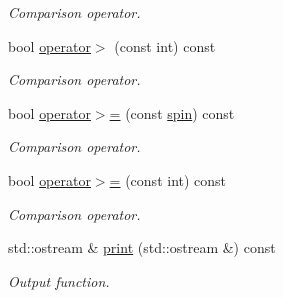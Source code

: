 \begin{DoxyCompactItemize}
\begin{DoxyCompactList}\small\item\em Comparison operator. \end{DoxyCompactList}\item 
\hypertarget{a00501_a3e08b91fc15d7275d8db060402d34e8e}{bool \hyperlink{a00501_a3e08b91fc15d7275d8db060402d34e8e}{operator$>$} (const int) const }\label{a00501_a3e08b91fc15d7275d8db060402d34e8e}

\begin{DoxyCompactList}\small\item\em Comparison operator. \end{DoxyCompactList}\item 
\hypertarget{a00501_afce1cce25214f867a2fe4fcf6d14ce87}{bool \hyperlink{a00501_afce1cce25214f867a2fe4fcf6d14ce87}{operator$>$=} (const \hyperlink{a00501}{spin}) const }\label{a00501_afce1cce25214f867a2fe4fcf6d14ce87}

\begin{DoxyCompactList}\small\item\em Comparison operator. \end{DoxyCompactList}\item 
\hypertarget{a00501_a8d9d2f96c3942ecee9d55e2a83a2250d}{bool \hyperlink{a00501_a8d9d2f96c3942ecee9d55e2a83a2250d}{operator$>$=} (const int) const }\label{a00501_a8d9d2f96c3942ecee9d55e2a83a2250d}

\begin{DoxyCompactList}\small\item\em Comparison operator. \end{DoxyCompactList}\item 
\hypertarget{a00501_a8b391d0065528c5748f11d31643b3c57}{std\-::ostream \& \hyperlink{a00501_a8b391d0065528c5748f11d31643b3c57}{print} (std\-::ostream \&) const }\label{a00501_a8b391d0065528c5748f11d31643b3c57}

\begin{DoxyCompactList}\small\item\em Output function. \end{DoxyCompactList}\end{DoxyCompactItemize}
